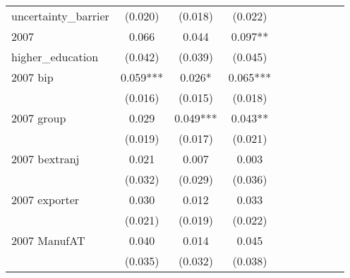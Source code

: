 \begin{table}[htbp]
\begin{tabular}{l*{9}{c}}
uncertainty\_barrier &     (0.020)   &     (0.018)   &     (0.022)   &               &               &               &               &               &               \\
2007                &       0.066   &       0.044   &       0.097** &               &               &               &               &               &               \\
higher\_education    &     (0.042)   &     (0.039)   &     (0.045)   &               &               &               &               &               &               \\
2007 bip            &       0.059***&       0.026*  &       0.065***&               &               &               &               &               &               \\
                    &     (0.016)   &     (0.015)   &     (0.018)   &               &               &               &               &               &               \\
2007 group          &       0.029   &       0.049***&       0.043** &               &               &               &               &               &               \\
                    &     (0.019)   &     (0.017)   &     (0.021)   &               &               &               &               &               &               \\
2007 bextranj       &       0.021   &       0.007   &       0.003   &               &               &               &               &               &               \\
                    &     (0.032)   &     (0.029)   &     (0.036)   &               &               &               &               &               &               \\
2007 exporter       &       0.030   &       0.012   &       0.033   &               &               &               &               &               &               \\
                    &     (0.021)   &     (0.019)   &     (0.022)   &               &               &               &               &               &               \\
2007 ManufAT        &       0.040   &       0.014   &       0.045   &               &               &               &               &               &               \\
                    &     (0.035)   &     (0.032)   &     (0.038)   &               &               &               &               &               &               \\

\end{tabular}
\end{table}
